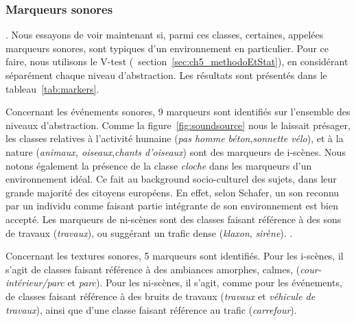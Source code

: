 \subsubsection{Marqueurs sonores}

 . Nous essayons de voir maintenant si, parmi ces classes, certaines, appelées marqueurs sonores, sont typiques d'un environnement en particulier. Pour ce faire, nous utilisons le V-test (\cf~section~\ref{sec:ch5_methodoEtStat}), en considérant séparément chaque niveau d'abstraction. Les résultats sont présentés dans le tableau~\ref{tab:markers}.

Concernant les événements sonores, 9 marqueurs sont identifiés sur l'ensemble des niveaux d'abstraction. Comme la figure~\ref{fig:soundsource} nous le laissait présager, les classes relatives à l'activité humaine (\emph{pas homme béton},\emph{sonnette vélo}), et à la nature (\emph{animaux, oiseaux},\emph{chants d'oiseaux}) sont des marqueurs de i-scènes. Nous notons également la présence de la classe \emph{cloche} dans les marqueurs d'un environnement idéal. Ce fait   au background socio-culturel des sujets, dans leur grande majorité des citoyens européens. En effet, selon Schafer, un son reconnu par un individu comme faisant partie intégrante de son environnement est bien accepté. Les marqueurs de ni-scènes sont des classes faisant référence à des sons de travaux (\emph{travaux}), ou suggérant un trafic dense (\emph{klaxon}, \emph{sirène}). .

Concernant les textures sonores, 5 marqueurs sont identifiés. Pour les i-scènes, il s'agit de classes faisant référence à des ambiances amorphes, calmes, (\emph{cour-intérieur/parc} et \emph{parc}). Pour les ni-scènes, il s'agit, comme pour les événements, de classes faisant référence à des bruits de travaux (\emph{travaux} et \emph{véhicule de travaux}), ainsi que d'une classe faisant référence au trafic (\emph{carrefour}).


